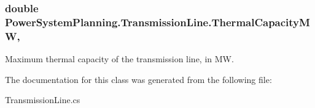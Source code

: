 \subsubsection[{\texorpdfstring{Thermal\+Capacity\+MW}{ThermalCapacityMW}}]{\setlength{\rightskip}{0pt plus 5cm}double Power\+System\+Planning.\+Transmission\+Line.\+Thermal\+Capacity\+MW\hspace{0.3cm}{\ttfamily [get]}, {\ttfamily [set]}}\hypertarget{class_power_system_planning_1_1_transmission_line_a0b11d55d8f8c39bb3f49133f02091f3c}{}\label{class_power_system_planning_1_1_transmission_line_a0b11d55d8f8c39bb3f49133f02091f3c}


Maximum thermal capacity of the transmission line, in MW. 



The documentation for this class was generated from the following file\+:\begin{DoxyCompactItemize}
\item 
Transmission\+Line.\+cs\end{DoxyCompactItemize}
